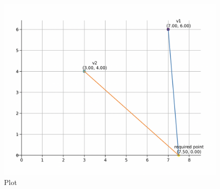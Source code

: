 \documentclass[12pt]{article}
\begin{document}
\begin{figure}[H]
    \centering
    \includegraphics[width=1.0\columnwidth]{Figs/Figure_2.png}
    \caption{Plot}
    \label{fig:placeholder}
\end{figure}
\end{document}
